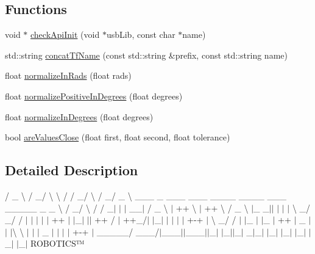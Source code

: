 \subsection*{Functions}
\begin{DoxyCompactItemize}
\item 
void $\ast$ \hyperlink{namespacejaco_ac891d6a7bd4014a514126248d0191413}{check\+Api\+Init} (void $\ast$usb\+Lib, const char $\ast$name)
\item 
std\+::string \hyperlink{namespacejaco_a6320c11725be13d2957c4e3f474d62f8}{concat\+Tf\+Name} (const std\+::string \&prefix, const std\+::string name)
\item 
float \hyperlink{namespacejaco_a564cf022c0783972c60ed14cfbc02a2a}{normalize\+In\+Rads} (float rads)
\item 
float \hyperlink{namespacejaco_aad452eaf0313477fc5c5b403de174118}{normalize\+Positive\+In\+Degrees} (float degrees)
\item 
float \hyperlink{namespacejaco_a3e97ea63ad53f1e71821c5eee9346224}{normalize\+In\+Degrees} (float degrees)
\item 
bool \hyperlink{namespacejaco_a09e679eeb93252a2cf092b064e724125}{are\+Values\+Close} (float first, float second, float tolerance)
\end{DoxyCompactItemize}


\subsection{Detailed Description}


 / \+\_\+ \textbackslash{} / \+\_\+/ \textbackslash{} \textbackslash{} / / \+\_\+/ \textbackslash{} / \+\_\+/ \+\_\+ \textbackslash{} \+\_\+\+\_\+\+\_\+ \+\_\+ \+\_\+\+\_\+\+\_\+ \+\_\+\+\_\+\+\_\+ \+\_\+\+\_\+\+\_\+\+\_\+ \+\_\+\+\_\+\+\_\+\+\_\+ \+\_\+\+\_\+\+\_\+ \+\_\+\+\_\+\+\_\+\+\_\+\+\_\+ \+\_\+ \+\_\+ \textbackslash{} / \+\_\+/ \textbackslash{} / / \+\_\+$|$ $\vert$ $\vert$ \+\_\+\+\_\+$\vert$ / \+\_\+ \textbackslash{} $\vert$ ++ \textbackslash{} $\vert$ ++ \textbackslash{} / \+\_\+ \textbackslash{} $\vert$\+\_\+ \+\_\+$\vert$$\vert$ $\vert$ $\vert$ $\vert$ \textbackslash{} \+\_\+/ \+\_\+/ / $\vert$ $\vert$ $\vert$ $\vert$ $\vert$ ++ $\vert$ $\vert$\+\_\+$\vert$ $\vert$$\vert$ ++ / $\vert$ ++\+\_\+/$\vert$ $\vert$\+\_\+$\vert$ $\vert$ $\vert$ $\vert$ $\vert$ +-\/+ $\vert$ \textbackslash{} \+\_\+/ / $\vert$ $\vert$\+\_\+ $\vert$ $\vert$\+\_\+ $\vert$ ++ $\vert$ \+\_\+ $\vert$$\vert$ $\vert$\textbackslash{} \textbackslash{} $\vert$ $\vert$ $\vert$ \+\_\+ $\vert$ $\vert$ $\vert$ $\vert$ +-\/+ $\vert$ \+\_\+\+\_\+\+\_\+\+\_\+\+\_\+/ \+\_\+\+\_\+\+\_\+/$\vert$\+\_\+\+\_\+\+\_\+$\vert$$\vert$\+\_\+\+\_\+\+\_\+$\vert$$\vert$\+\_\+$\vert$ $\vert$\+\_\+$\vert$$\vert$\+\_\+$\vert$ \+\_\+$|$\+\_\+$\vert$ $\vert$\+\_\+$\vert$ $\vert$\+\_\+$\vert$ $\vert$\+\_\+$\vert$ $\vert$\+\_\+$\vert$ $\vert$\+\_\+$\vert$ R\+O\+B\+O\+T\+I\+C\+S™

